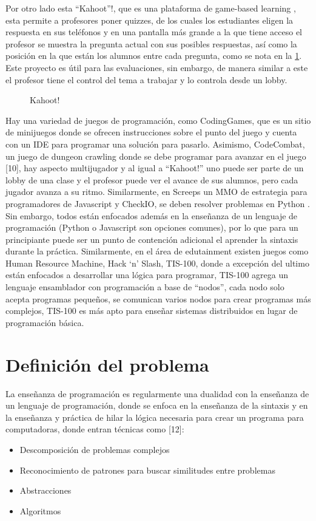 Por otro lado esta “Kahoot”!, que es una plataforma de game-based learning \cite{wang2015a}, esta permite a profesores poner quizzes, de los cuales los estudiantes eligen la respuesta en sus teléfonos y en una pantalla más grande a la que tiene acceso el profesor se muestra la pregunta actual con sus posibles respuestas, así como la posición en la que están los alumnos entre cada pregunta, como se nota en la \ref{fig:kahoot}. Este proyecto es útil para las evaluaciones, sin embargo, de manera similar a este el profesor tiene el control del tema a trabajar y lo controla desde un lobby. 

\begin{figure}
    \caption{Kahoot!}
    \centering
    \label{fig:kahoot}
\end{figure}

Hay una variedad de juegos de programación, como CodingGames, que es un sitio de minijuegos donde se ofrecen instrucciones sobre el punto del juego y cuenta con un IDE para programar una solución para pasarlo. Asimismo, CodeCombat, un juego de dungeon crawling donde se debe programar para avanzar en el juego [10], hay aspecto multijugador y al igual a “Kahoot!” uno puede ser parte de un lobby de una clase y el profesor puede ver el avance de sus alumnos, pero cada jugador avanza a su ritmo. Similarmente, en Screeps un MMO de estrategia para programadores de Javascript y CheckIO, se deben resolver problemas en Python \cite{programming_games}. Sin embargo, todos están enfocados además en la enseñanza de un lenguaje de programación (Python o Javascript son opciones comunes), por lo que para un principiante puede ser un punto de contención adicional el aprender la sintaxis durante la práctica. Similarmente, en el área de edutainment existen juegos como Human Resource Machine, Hack ‘n’ Slash, TIS-100, donde a excepción del ultimo están enfocados a desarrollar una lógica para programar, TIS-100 agrega un lenguaje ensamblador con programación a base de “nodos”, cada nodo solo acepta programas pequeños, se comunican varios nodos para crear programas más complejos, TIS-100 es más apto para enseñar sistemas distribuidos en lugar de programación básica.

\section{Definición del problema}
La enseñanza de programación es regularmente una dualidad con la enseñanza de un lenguaje de programación, donde se enfoca en la enseñanza de la sintaxis y en la enseñanza y práctica de hilar la lógica necesaria para crear un programa para computadoras, donde entran técnicas como [12]:
\begin{itemize}
    \item Descomposición de problemas complejos
    \item Reconocimiento de patrones para buscar similitudes entre problemas
    \item Abstracciones
    \item Algoritmos
\end{itemize}

